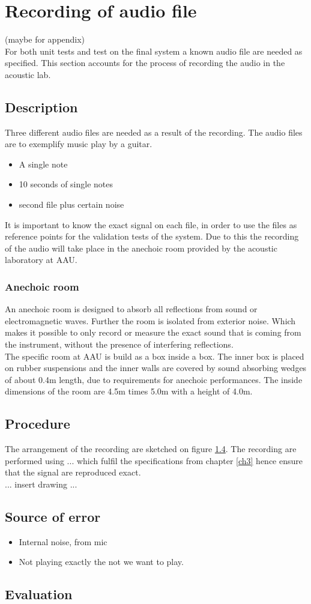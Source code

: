 \section{Recording of audio file}
(maybe for appendix)\\
For both unit tests and test on the final system a known audio file are needed as specified. This section accounts for the process of recording the audio in the acoustic lab.
\subsection{Description}
Three different audio files are needed as a result of the recording. The audio files are to exemplify music play by a guitar.   
\begin{itemize}
\item[1.] A single note  
\item[2.] 10 seconds of single notes  
\item[3.] second file plus certain noise
\end{itemize} 
It is important to know the exact signal on each file, in order to use the files as reference points for the validation tests of the system. Due to this the recording of the audio will take place in the anechoic room provided by the acoustic laboratory at AAU.
\subsubsection{Anechoic room}   
An anechoic room is designed to absorb all reflections from sound or electromagnetic waves. Further the room is isolated from exterior noise. Which makes it possible to only record or measure the exact sound that is coming from the instrument, without the presence of interfering reflections. \\ The specific room at AAU is build as a box inside a box. The inner box is placed on rubber suspensions and the inner walls are covered by sound absorbing wedges of about 0.4m length, due to requirements for anechoic performances. The inside dimensions of the room are 4.5m times 5.0m with a height of 4.0m.

\subsection{Procedure}
The arrangement of the recording are sketched on figure \ref{}. The recording are performed using ... which fulfil the specifications from chapter \ref{ch3} hence ensure that the signal are reproduced exact.\\ 
... insert drawing ...


\subsection{Source of error}
\begin{itemize}
\item[-] Internal noise, from mic 
\item[-]	 Not playing exactly the not we want to play. 
\end{itemize}

\subsection{Evaluation}
 

